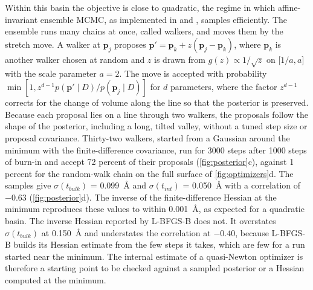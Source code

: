Within this basin the objective is close to quadratic, the regime in which affine-invariant ensemble MCMC,\autocite{goodmanEnsembleSamplersAffine2010} as implemented in \autocite{foreman-mackeyEmceeMCMCHammer2013} and ,\autocite{nelsonRefnxNeutronXray2019} samples efficiently. The ensemble runs many chains at once, called walkers, and moves them by the stretch move. A walker at \(\mathbf{p}_{j}\) proposes \(\mathbf{p}' = \mathbf{p}_{k} + z\left( \mathbf{p}_{j} - \mathbf{p}_{k} \right)\), where \(\mathbf{p}_{k}\) is another walker chosen at random and \(z\) is drawn from \(g(z) \propto 1/\sqrt{z}\) on \(\lbrack 1/a,a\rbrack\) with the scale parameter \(a = 2\). The move is accepted with probability \(\min\left\lbrack 1,z^{d - 1}p(\mathbf{p}' \mid D)/p\left( \mathbf{p}_{j} \mid D \right) \right\rbrack\) for \(d\) parameters, where the factor \(z^{d - 1}\) corrects for the change of volume along the line so that the posterior is preserved. Because each proposal lies on a line through two walkers, the proposals follow the shape of the posterior, including a long, tilted valley, without a tuned step size or proposal covariance. Thirty-two walkers, started from a Gaussian around the minimum with the finite-difference covariance, run for 3000 steps after 1000 steps of burn-in and accept 72 percent of their proposals (\cref{fig:posterior}c), against 1 percent for the random-walk chain on the full surface of \cref{fig:optimizers}d. The samples give \(\sigma\left( t_{bulk} \right)\) = \qty{0.099}{\angstrom} and \(\sigma\left( t_{int} \right)\) = \qty{0.050}{\angstrom} with a correlation of \(- 0.63\) (\cref{fig:posterior}d). The inverse of the finite-difference Hessian at the minimum reproduces these values to within \qty{0.001}{\angstrom}, as expected for a quadratic basin. The inverse Hessian reported by L-BFGS-B does not. It overstates \(\sigma\left( t_{bulk} \right)\) at \qty{0.150}{\angstrom} and understates the correlation at \(- 0.40\), because L-BFGS-B builds its Hessian estimate from the few steps it takes, which are few for a run started near the minimum. The internal estimate of a quasi-Newton optimizer is therefore a starting point to be checked against a sampled posterior or a Hessian computed at the minimum.

